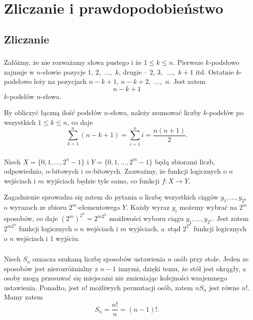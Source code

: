 \chapter{Zliczanie i prawdopodobieństwo}

\section{Zliczanie}

\subsection{} %
Załóżmy, że nie rozważamy słowa pustego i że $1\le k\le n$. Pierwsze $k$-podsłowo zajmuje w $n$-słowie pozycje $1$, $2$,~$\dots$,~$k$, drugie -- $2$, $3,$~$\dots$,~$k+1$ itd. Ostatnie $k$-podsłowo leży na pozycjach $n-k+1$, $n-k+2$,~$\dots$,~$n$. Jest zatem
\[
	n-k+1
\]
$k$-podsłów $n$-słowa.

By obliczyć łączną ilość podsłów $n$-słowa, należy zsumować liczby $k$-podsłów po wszystkich $1\le k\le n$, co daje
\[
	\sum_{k=1}^n(n-k+1) = \sum_{i=1}^ni = \frac{n(n+1)}{2}.
\]

\subsection{} %
Niech $X=\{0,1,\dots,2^n-1\}$ i $Y=\{0,1,\dots,2^m-1\}$ będą zbiorami liczb, odpowiednio, $n$-bitowych i $m$-bitowych. Zauważmy, że funkcji logicznych o $n$ wejściach i $m$ wyjściach będzie tyle samo, co funkcji $f\colon X\to Y$.

Zagadnienie sprowadza się zatem do pytania o liczbę wszystkich ciągów $y_1,\dots,y_{2^n}$ o wyrazach ze zbioru $2^m$-elementowego $Y$. Każdy wyraz $y_i$ możemy wybrać na $2^m$ sposobów, co daje $(2^m)^{2^n} = 2^{m2^n}$ możliwości wyboru ciągu $y_1,\dots,y_{2^n}$. Jest zatem $2^{m2^n}$ funkcji logicznych o $n$ wejściach i $m$ wyjściach, a~stąd $2^{2^n}$ funkcji logicznych o $n$ wejściach i 1 wyjściu.

\subsection{} %
Niech $S_n$ oznacza szukaną liczbę sposobów ustawienia $n$ osób przy stole. Jeden ze sposobów jest nierozróżnialny z $n-1$ innymi, dzięki temu, że stół jest okrągły, a osoby mogą przesuwać się miejscami nie zmieniając kolejności wzajemnego ustawienia. Ponadto, jest $n!$ możliwych permutacji osób, zatem $nS_n$ jest równe $n!$. Mamy zatem
\[
	S_n = \frac{n!}{n} = (n-1)!.
\]

